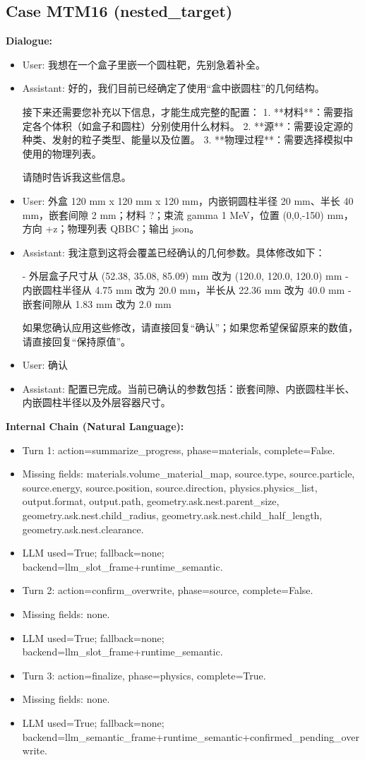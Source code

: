 \documentclass[11pt]{ctexart}
\begin{document}
\subsection{Case MTM16 (nested\_target)}
\textbf{Dialogue:}
\begin{itemize}
\item User: 我想在一个盒子里嵌一个圆柱靶，先别急着补全。
\item Assistant: 好的，我们目前已经确定了使用“盒中嵌圆柱”的几何结构。

接下来还需要您补充以下信息，才能生成完整的配置：
1.  **材料**：需要指定各个体积（如盒子和圆柱）分别使用什么材料。
2.  **源**：需要设定源的种类、发射的粒子类型、能量以及位置。
3.  **物理过程**：需要选择模拟中使用的物理列表。

请随时告诉我这些信息。
\item User: 外盒 120 mm x 120 mm x 120 mm，内嵌铜圆柱半径 20 mm、半长 40 mm，嵌套间隙 2 mm；材料 ?；束流 gamma 1 MeV，位置 (0,0,-150) mm，方向 +z；物理列表 QBBC；输出 json。
\item Assistant: 我注意到这将会覆盖已经确认的几何参数。具体修改如下：

- 外层盒子尺寸从 (52.38, 35.08, 85.09) mm 改为 (120.0, 120.0, 120.0) mm
- 内嵌圆柱半径从 4.75 mm 改为 20.0 mm，半长从 22.36 mm 改为 40.0 mm
- 嵌套间隙从 1.83 mm 改为 2.0 mm

如果您确认应用这些修改，请直接回复“确认”；如果您希望保留原来的数值，请直接回复“保持原值”。
\item User: 确认
\item Assistant: 配置已完成。当前已确认的参数包括：嵌套间隙、内嵌圆柱半长、内嵌圆柱半径以及外层容器尺寸。
\end{itemize}
\textbf{Internal Chain (Natural Language):}
\begin{itemize}
\item Turn 1: action=summarize\_progress, phase=materials, complete=False.
\item Missing fields: materials.volume\_material\_map, source.type, source.particle, source.energy, source.position, source.direction, physics.physics\_list, output.format, output.path, geometry.ask.nest.parent\_size, geometry.ask.nest.child\_radius, geometry.ask.nest.child\_half\_length, geometry.ask.nest.clearance.
\item LLM used=True; fallback=none; backend=llm\_slot\_frame+runtime\_semantic.
\item Turn 2: action=confirm\_overwrite, phase=source, complete=False.
\item Missing fields: none.
\item LLM used=True; fallback=none; backend=llm\_slot\_frame+runtime\_semantic.
\item Turn 3: action=finalize, phase=physics, complete=True.
\item Missing fields: none.
\item LLM used=True; fallback=none; backend=llm\_semantic\_frame+runtime\_semantic+confirmed\_pending\_overwrite.
\end{itemize}
\end{document}
